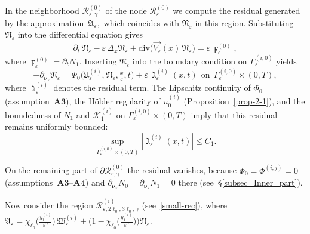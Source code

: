 \documentclass[reqno]{amsart}            %
\numberwithin{equation}{section}
\begin{document}
	In the neighborhood $\mathcal{R}^{(0)}_{\varepsilon,\gamma}$ of the node 
	$\mathcal{R}^{(0)}_{\varepsilon}$ we compute the residual generated by the 
	approximation~$\mathfrak{A}_\varepsilon,$ which coincides with $\mathfrak{N}_\varepsilon$ in this region. Substituting $\mathfrak{N}_\varepsilon$ 
	into the differential equation gives
	\begin{equation}\label{Res_6}
		\partial_t\,\mathfrak{N}_\varepsilon -  \varepsilon\, \Delta_x  \mathfrak{N}_\varepsilon +
		\mathrm{div} \big( \overrightarrow{V_\varepsilon}(x) \, \mathfrak{N}_\varepsilon\big)
		= \varepsilon\, \digamma^{(0)}_\varepsilon, 
	\end{equation}
	where $\digamma^{(0)}_\varepsilon = \partial_t N_1.$
	Inserting $\mathfrak{N}_\varepsilon$ into the boundary condition on 
	$\Gamma^{(i,0)}_\varepsilon$ yields
	\begin{equation}\label{Res_7}
		-   \partial_{\boldsymbol{\nu}_\varepsilon} \mathfrak{N}_\varepsilon  = \Phi_0\big(\mathfrak{U}^{(i)}_{\varepsilon}, \mathfrak{N}_\varepsilon,\tfrac{x}{\varepsilon}, t \big) + \varepsilon \, \gimel^{(i)}_\varepsilon(x,t) 
		\ \   \text{on} \ \   \Gamma^{(i,0)}_\varepsilon\times(0,T), 
	\end{equation}
	where $\gimel^{(i)}_\varepsilon$ denotes the residual term. The Lipschitz continuity of $\Phi_0$ 
	(assumption~$\mathbf{A3}$), the Hölder regularity of $u_0^{(i)}$ 
	(Proposition~\ref{prop-2-1}), and the boundedness of $N_1$ and $\mathcal{K}^{(i)}_1$ on 
	$\Gamma^{(i,0)}_\varepsilon\times(0,T)$ imply that this residual remains uniformly bounded:
	\begin{equation}\label{Res_5}
		\sup_{\Gamma^{(i,0)}_\varepsilon\times(0,T)}
		|\gimel^{(i)}_\varepsilon(x,t)| \le C_1.
	\end{equation}
	
	On the remaining part of $\partial\mathcal{R}^{(0)}_{\varepsilon,\gamma}$ the residual 
	vanishes, because $\Phi_0=\Phi^{(i,j)}=0$ (assumptions~$\mathbf{A3}$–$\mathbf{A4}$) and 
	$\partial_{\boldsymbol{\nu}_\varepsilon}N_0
	=\partial_{\boldsymbol{\nu}_\varepsilon}N_1=0$ there 
	(see~\S\ref{subsec_Inner_part}).
	
	Now consider the region $\mathcal{R}^{(i)}_{\varepsilon,2\ell_0,3\ell_0,\gamma}$ (see~\eqref{small-rec}), where $\mathfrak{A}_\varepsilon = \chi_{\ell_0}\big(\frac{y^{(i)}_1}{\varepsilon^\gamma}\big)\, \mathfrak{W}^{(i)}_\varepsilon +
	\big(1- \chi_{\ell_0}\big(\frac{y^{(i)}_1}{\varepsilon^\gamma}\big)\big) \mathfrak{N}_\varepsilon.$ 
	
\end{document}
